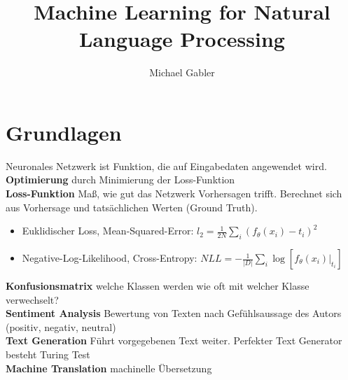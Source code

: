 \documentclass[12pt]{article}
\begin{document}
	\title{Machine Learning for Natural Language Processing}
	\author{Michael Gabler}
	\maketitle
	\tableofcontents
	\newpage

	\section{Grundlagen}
	Neuronales Netzwerk ist Funktion, die auf Eingabedaten angewendet wird.\\
	\textbf{Optimierung} durch Minimierung der Loss-Funktion\\
	\textbf{Loss-Funktion} Maß, wie gut das Netzwerk Vorhersagen trifft. Berechnet sich aus Vorhersage und tatsächlichen Werten (Ground Truth).
	\begin{itemize}
		\item Euklidischer Loss, Mean-Squared-Error: $l_2 = \frac{1}{2N} \sum_i (f_\theta(x_i)-t_i)^2$
		\item Negative-Log-Likelihood, Cross-Entropy: $NLL = -\frac{1}{|D|}\sum_i \log[f_\theta(x_i)|_{t_i}]$
	\end{itemize}
	\textbf{Konfusionsmatrix} welche Klassen werden wie oft mit welcher Klasse verwechselt?\\
	\textbf{Sentiment Analysis} Bewertung von Texten nach Gefühlsaussage des Autors (positiv, negativ, neutral)\\
	\textbf{Text Generation} Führt vorgegebenen Text weiter. Perfekter Text Generator besteht Turing Test\\
	\textbf{Machine Translation} machinelle Übersetzung\\
	
\end{document}
